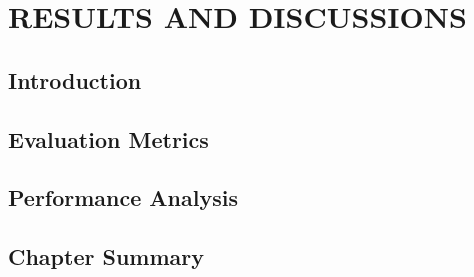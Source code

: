 \chapter{RESULTS AND DISCUSSIONS}
\label{chap4:result}


\section{Introduction}
\label{chapt4-intro}



\section{Evaluation Metrics}
\label{chapt4-sec-1}



\section{Performance Analysis}%
\label{chap4sec-performance}



\section{Chapter Summary}
\label{chap4sec:summary}


